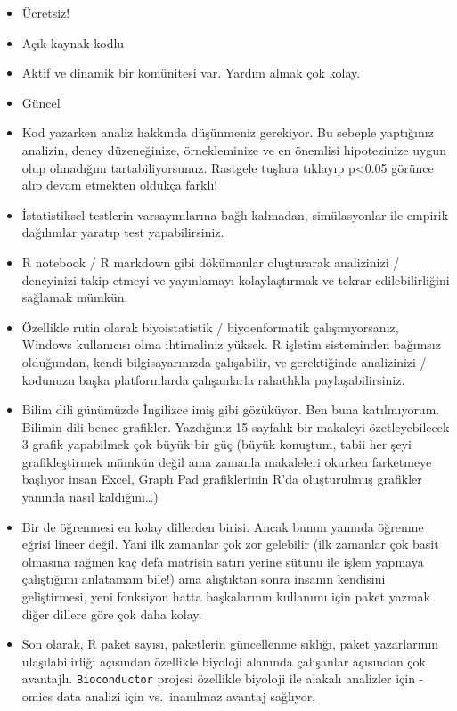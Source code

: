 \documentclass[]{book}
\providecommand{\tightlist}{%
  \setlength{\itemsep}{0pt}\setlength{\parskip}{0pt}}
\begin{document}
\begin{itemize}
\tightlist
\item
  Ücretsiz!
\item
  Açık kaynak kodlu
\item
  Aktif ve dinamik bir komünitesi var. Yardım almak çok kolay.
\item
  Güncel
\item
  Kod yazarken analiz hakkında düşünmeniz gerekiyor. Bu sebeple
  yaptığınız analizin, deney düzeneğinize, örnekleminize ve en önemlisi
  hipotezinize uygun olup olmadığını tartabiliyorsunuz. Rastgele tuşlara
  tıklayıp p\textless{}0.05 görünce alıp devam etmekten oldukça farklı!
\item
  İstatistiksel testlerin varsayımlarına bağlı kalmadan, simülasyonlar
  ile empirik dağılımlar yaratıp test yapabilirsiniz.
\item
  R notebook / R markdown gibi dökümanlar oluşturarak analizinizi /
  deneyinizi takip etmeyi ve yayınlamayı kolaylaştırmak ve tekrar
  edilebilirliğini sağlamak mümkün.
\item
  Özellikle rutin olarak biyoistatistik / biyoenformatik
  çalışmıyorsanız, Windows kullanıcısı olma ihtimaliniz yüksek. R
  işletim sisteminden bağımsız olduğundan, kendi bilgisayarınızda
  çalışabilir, ve gerektiğinde analizinizi / kodunuzu başka
  platformlarda çalışanlarla rahatlıkla paylaşabilirsiniz.
\item
  Bilim dili günümüzde İngilizce imiş gibi gözüküyor. Ben buna
  katılmıyorum. Bilimin dili bence grafikler. Yazdığınız 15 sayfalık bir
  makaleyi özetleyebilecek 3 grafik yapabilmek çok büyük bir güç (büyük
  konuştum, tabii her şeyi grafikleştirmek mümkün değil ama zamanla
  makaleleri okurken farketmeye başlıyor insan Excel, Graph Pad
  grafiklerinin R'da oluşturulmuş grafikler yanında nasıl
  kaldığını\ldots{})
\item
  Bir de öğrenmesi en kolay dillerden birisi. Ancak bunun yanında
  öğrenme eğrisi lineer değil. Yani ilk zamanlar çok zor gelebilir (ilk
  zamanlar çok basit olmasına rağmen kaç defa matrisin satırı yerine
  sütunu ile işlem yapmaya çalıştığımı anlatamam bile!) ama alıştıktan
  sonra insanın kendisini geliştirmesi, yeni fonksiyon hatta
  başkalarının kullanımı için paket yazmak diğer dillere göre çok daha
  kolay.
\item
  Son olarak, R paket sayısı, paketlerin güncellenme sıklığı, paket
  yazarlarının ulaşılabilirliği açısından özellikle biyoloji alanında
  çalışanlar açısından çok avantajlı. \texttt{Bioconductor} projesi
  özellikle biyoloji ile alakalı analizler için -omics data analizi için
  vs.~inanılmaz avantaj sağlıyor.
\end{itemize}
\end{document}
